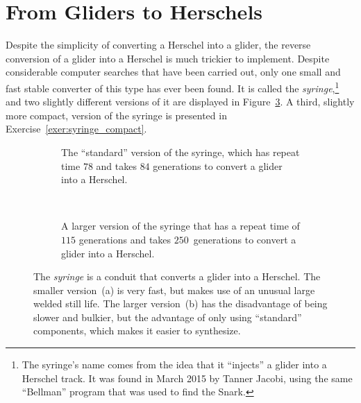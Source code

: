 \section{From Gliders to Herschels}\label{sec:g_to_h}

Despite the simplicity of converting a Herschel into a glider, the reverse conversion of a glider into a Herschel is much trickier to implement. Despite considerable computer searches that have been carried out, only one small and fast stable converter of this type has ever been found. It is called the \emph{syringe},\footnote{The syringe's name comes from the idea that it ``injects'' a glider into a Herschel track. It was found in March 2015 by Tanner Jacobi, using the same ``Bellman'' program that was used to find the Snark.} and two slightly different versions of it are displayed in Figure~\ref{fig:syringe}. A third, slightly more compact, version of the syringe is presented in Exercise~\ref{exer:syringe_compact}.

\begin{figure}[!htb]
	\centering
	\begin{subfigure}{.33\textwidth}
		\centering{}
		\caption{The ``standard'' version of the syringe, which has repeat time $78$ and takes $84$ generations to convert a glider into a Herschel.}\label{fig:syringe_main}
	\end{subfigure} \ \ \ \ %
	\begin{subfigure}{.635\textwidth}
		\centering{}
		\caption{A larger version of the syringe that has a repeat time of $115$ generations and takes $250$~generations to convert a glider into a Herschel.}
		\label{fig:syringe_modified}
	\end{subfigure}
	\caption{The \emph{syringe} is a conduit that converts a glider into a Herschel. The smaller version~(a) is very fast, but makes use of an unusual large welded still life. The larger version~(b) has the disadvantage of being slower and bulkier, but the advantage of only using ``standard'' components, which makes it easier to synthesize.}\label{fig:syringe}
\end{figure}

